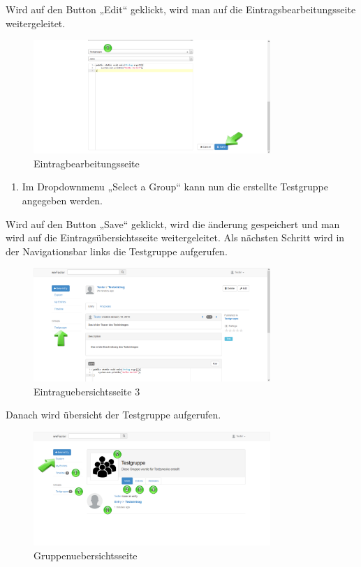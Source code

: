 Wird auf den Button „Edit“ geklickt, wird man auf die Eintragsbearbeitungsseite weitergeleitet.

\begin{figure}[H]
    \centering
    \includegraphics[width=0.8\textwidth]{Bilder/22.png}
    \caption{Eintragbearbeitungsseite}
    \label{fig:eintragbearbeitungsseite}
\end{figure}


\begin{enumerate}
\item Im Dropdownmenu „Select a Group“ kann nun die erstellte Testgruppe angegeben werden.
\end{enumerate}


Wird auf den Button „Save“ geklickt, wird die änderung gespeichert und man wird auf die Eintragsübersichtsseite weitergeleitet.
Als nächsten Schritt wird in der Navigationsbar links die Testgruppe aufgerufen.

\begin{figure}[H]
    \centering
    \includegraphics[width=0.8\textwidth]{Bilder/23.png}
    \caption{Eintraguebersichtsseite 3}
    \label{fig:eintraguebersichtsseite3}
\end{figure}


Danach wird übersicht der Testgruppe aufgerufen.

\begin{figure}[H]
    \centering
    \includegraphics[width=0.8\textwidth]{Bilder/24.png}
    \caption{Gruppenuebersichtsseite}
    \label{fig:gruppenuebersichtsseite}
\end{figure}


